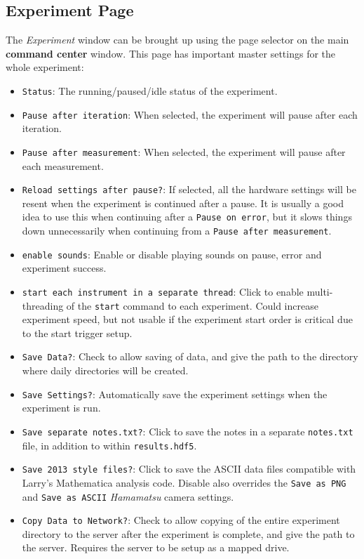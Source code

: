 \documentclass[pdftex,11pt,letterpaper]{article}
\begin{document}
\subsection{Experiment Page}

The \textit{Experiment} window can be brought up using the page selector on the main \textbf{command center} window.  This page has important master settings for the whole experiment:

\begin{itemize}
\item \texttt{Status}:  The running/paused/idle status of the experiment.
\item \texttt{Pause after iteration}:  When selected, the experiment will pause after each iteration.
\item \texttt{Pause after measurement}:  When selected, the experiment will pause after each measurement.
\item \texttt{Reload settings after pause?}:  If selected, all the hardware settings will be resent when the experiment is continued after a pause.  It is usually a good idea to use this when continuing after a \texttt{Pause on error}, but it slows things down unnecessarily when continuing from a \texttt{Pause after measurement}.
\item \texttt{enable sounds}:  Enable or disable playing sounds on pause, error and experiment success.
\item \texttt{start each instrument in a separate thread}:  Click to enable multi-threading of the \texttt{start} command to each experiment.  Could increase experiment speed, but not usable if the experiment start order is critical due to the start trigger setup.
\item \texttt{Save Data?}:  Check to allow saving of data, and give the path to the directory where daily directories will be created.
\item \texttt{Save Settings?}:  Automatically save the experiment settings when the experiment is run.
\item \texttt{Save separate notes.txt?}:  Click to save the notes in a separate \texttt{notes.txt} file, in addition to within \texttt{results.hdf5}.
\item \texttt{Save 2013 style files?}:  Click to save the ASCII data files compatible with Larry's Mathematica analysis code.  Disable also overrides the \texttt{Save as PNG} and \texttt{Save as ASCII} \textit{Hamamatsu} camera settings.
\item \texttt{Copy Data to Network?}:  Check to allow copying of the entire experiment directory to the server after the experiment is complete, and give the path to the server.  Requires the server to be setup as a mapped drive.

\end{itemize}
\end{document}
